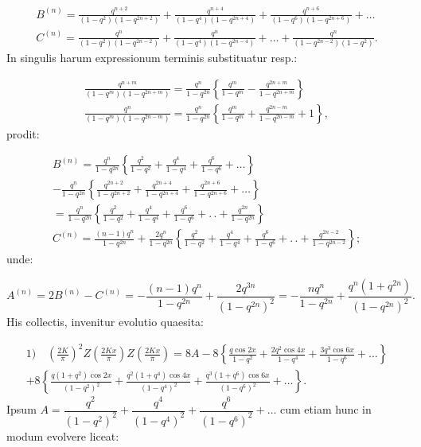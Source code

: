\documentclass{article}
\begin{document}
\[
\begin{gathered}
B^{(n)}=\frac{q^{n+2}}{(1-q^{2})(1-q^{2n+2})}+\frac{q^{n+4}}{(1-q^{4})(1-q^{2n+4})}+\frac{q^{n+6}}{(1-q^{6})(1-q^{2n+6})}+\ldots\\[1.5ex]
C^{(n)}=\frac{q^{n}}{(1-q^{2})(1-q^{2n-2})}+\frac{q^{n}}{(1-q^{4})(1-q^{2n-4})}+\ldots+\frac{q^{n}}{(1-q^{2n-2})(1-q^{2})}.
\end{gathered}
\]
In singulis harum expressionum terminis substituatur resp.:

\[
\begin{gathered}
\frac{q^{n+m}}{(1-q^{m})(1-q^{2n+m})}=\frac{q^{n}}{1-q^{2n}}\left\{\frac{q^{m}}{1-q^{m}}-\frac{q^{2n+m}}{1-q^{2n+m}}\right\}\\[1.5ex]
\frac{q^{n}}{(1-q^{m})(1-q^{2n-m})}=\frac{q^{n}}{1-q^{2n}}\left\{\frac{q^{m}}{1-q^{m}}+\frac{q^{2n-m}}{1-q^{2n-m}}+1\right\},
\end{gathered}
\]
prodit:

\[
\begin{gathered}
B^{(n)}=\frac{q^{n}}{1-q^{2n}}\left\{\frac{q^{2}}{1-q^{2}}+\frac{q^{4}}{1-q^{4}}+\frac{q^{6}}{1-q^{6}}+\ldots\right\}\\[1.5ex]
-\frac{q^{n}}{1-q^{2n}}\left\{\frac{q^{2n+2}}{1-q^{2n+2}}+\frac{q^{2n+4}}{1-q^{2n+4}}+\frac{q^{2n+6}}{1-q^{2n+6}}+\ldots\right\}\\[1.5ex]
=\frac{q^{n}}{1-q^{2n}}\left\{\frac{q^{2}}{1-q^{2}}+\frac{q^{4}}{1-q^{4}}+\frac{q^{6}}{1-q^{6}}+.\,.+\frac{q^{2n}}{1-q^{2n}}\right\}\\[1.5ex]
C^{(n)}=\frac{(n-1)q^{n}}{1-q^{2n}}+\frac{2q^{n}}{1-q^{2n}}\left\{\frac{q^{2}}{1-q^{2}}+\frac{q^{4}}{1-q^{4}}+\frac{q^{6}}{1-q^{6}}+.\,.+\frac{q^{2n-2}}{1-q^{2n-2}}\right\};
\end{gathered}
\]
unde:

\[
A^{(n)}=2B^{(n)}-C^{(n)}=-\frac{(n-1)q^{n}}{1-q^{2n}}+\frac{2q^{3n}}{(1-q^{2n})^{2}}=-\frac{nq^{n}}{1-q^{2n}}+\frac{q^{n}(1+q^{2n})}{(1-q^{2n})^{2}}.
\]
His collectis, invenitur evolutio quaesita:

\[
\begin{gathered}
\text{1)}\quad\left(\frac{2K}{\pi}\right)^{2}Z\left(\frac{2Kx}{\pi}\right)Z\left(\frac{2Kx}{\pi}\right)=8A-8\left\{\frac{q\cos2x}{1-q^{2}}+\frac{2q^{2}\cos4x}{1-q^{4}}+\frac{3q^{3}\cos6x}{1-q^{6}}+\ldots\right\}\\[1.5ex]
+8\left\{\frac{q(1+q^{2})\cos2x}{(1-q^{2})^{2}}+\frac{q^{2}(1+q^{4})\cos4x}{(1-q^{4})^{2}}+\frac{q^{3}(1+q^{6})\cos6x}{(1-q^{6})^{2}}+\ldots\right\}.
\end{gathered}
\]
Ipsum $A=\dfrac{q^{2}}{(1-q^{2})^{2}}+\dfrac{q^{4}}{(1-q^{4})^{2}}+\dfrac{q^{6}}{(1-q^{6})^{2}}+\ldots$ cum etiam hunc in modum evolvere liceat:
\end{document}
